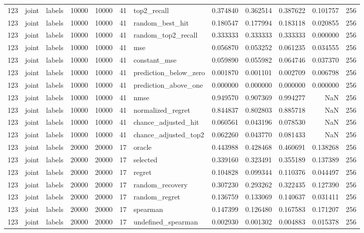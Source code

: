 \begin{tabular}{rllrrrlrrrrr}
123 & joint & labels & 10000 & 10000 & 41 & top2_recall & 0.374840 & 0.362514 & 0.387622 & 0.101757 & 256 \\
123 & joint & labels & 10000 & 10000 & 41 & random_best_hit & 0.180547 & 0.177994 & 0.183118 & 0.020855 & 256 \\
123 & joint & labels & 10000 & 10000 & 41 & random_top2_recall & 0.333333 & 0.333333 & 0.333333 & 0.000000 & 256 \\
123 & joint & labels & 10000 & 10000 & 41 & mse & 0.056870 & 0.053252 & 0.061235 & 0.034555 & 256 \\
123 & joint & labels & 10000 & 10000 & 41 & constant_mse & 0.059890 & 0.055982 & 0.064746 & 0.037370 & 256 \\
123 & joint & labels & 10000 & 10000 & 41 & prediction_below_zero & 0.001870 & 0.001101 & 0.002709 & 0.006798 & 256 \\
123 & joint & labels & 10000 & 10000 & 41 & prediction_above_one & 0.000000 & 0.000000 & 0.000000 & 0.000000 & 256 \\
123 & joint & labels & 10000 & 10000 & 41 & nmse & 0.949570 & 0.907369 & 0.994277 & NaN & 256 \\
123 & joint & labels & 10000 & 10000 & 41 & normalized_regret & 0.844837 & 0.802803 & 0.885718 & NaN & 256 \\
123 & joint & labels & 10000 & 10000 & 41 & chance_adjusted_hit & 0.060561 & 0.043196 & 0.078530 & NaN & 256 \\
123 & joint & labels & 10000 & 10000 & 41 & chance_adjusted_top2 & 0.062260 & 0.043770 & 0.081433 & NaN & 256 \\
123 & joint & labels & 20000 & 20000 & 17 & oracle & 0.443988 & 0.428468 & 0.460691 & 0.138268 & 256 \\
123 & joint & labels & 20000 & 20000 & 17 & selected & 0.339160 & 0.323491 & 0.355189 & 0.137389 & 256 \\
123 & joint & labels & 20000 & 20000 & 17 & regret & 0.104828 & 0.099344 & 0.110376 & 0.044497 & 256 \\
123 & joint & labels & 20000 & 20000 & 17 & random_recovery & 0.307230 & 0.293262 & 0.322435 & 0.127390 & 256 \\
123 & joint & labels & 20000 & 20000 & 17 & random_regret & 0.136759 & 0.133069 & 0.140637 & 0.031411 & 256 \\
123 & joint & labels & 20000 & 20000 & 17 & spearman & 0.147399 & 0.126480 & 0.167583 & 0.171207 & 256 \\
123 & joint & labels & 20000 & 20000 & 17 & undefined_spearman & 0.002930 & 0.001302 & 0.004883 & 0.015378 & 256 \\

\end{tabular}
